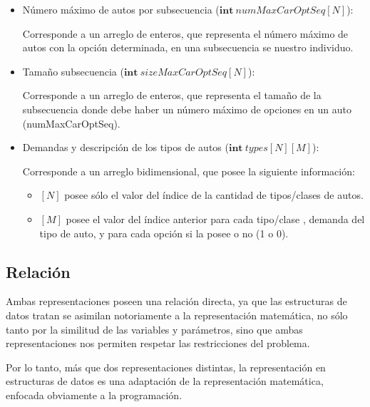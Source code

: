\begin{itemize}
	\item Número máximo de autos por subsecuencia ($\textbf{int}\ numMaxCarOptSeq[N]$):
	
		Corresponde a un arreglo de enteros, que representa el número máximo de autos con la opción determinada, en una subsecuencia se nuestro individuo.


	\item Tamaño subsecuencia ($\textbf{int}\ sizeMaxCarOptSeq[N]$):

		Corresponde a un arreglo de enteros, que representa el tamaño de la subsecuencia donde debe haber un número máximo de opciones en un auto (numMaxCarOptSeq).

	\item Demandas y descripción de los tipos de autos ($\textbf{int}\ types[N][M]$):
	
	Corresponde a un arreglo bidimensional, que posee la siguiente información:
	\begin{itemize}
		\item $[N]$ posee sólo el valor del índice de la cantidad de tipos/clases de autos.
		\item $[M]$ posee el valor del índice anterior para cada tipo/clase , demanda del tipo de auto, y para cada opción si la posee o no (1 o 0).
	\end{itemize}
	

\end{itemize}
\subsection{Relación}

Ambas representaciones poseen una relación directa, ya que las estructuras de datos tratan se asimilan notoriamente a la representación matemática,
no sólo tanto por la similitud de las variables y parámetros, sino que ambas representaciones nos permiten respetar las restricciones del problema.

Por lo tanto, más que dos representaciones distintas, la representación en estructuras de datos es una adaptación de la representación matemática,
enfocada obviamente a la programación.
